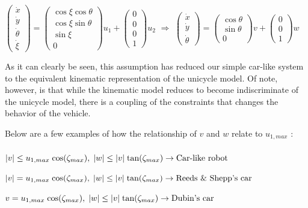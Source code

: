 \documentclass[twoside]{article}
\begin{document}
\begin{center}
$
\begin{pmatrix}
\dot{x} \\ \dot{y} \\ \dot{\theta} \\ \dot{\xi}
\end{pmatrix} =
\begin{pmatrix} \cos \xi \cos \theta \\ \cos \xi \sin \theta \\ \sin \xi \\ 0 \end{pmatrix} u_1 + \begin{pmatrix} 0 \\ 0 \\ 0 \\ 1 \end{pmatrix} u_2
$ $\Rightarrow$ $
\begin{pmatrix}
\dot{x} \\ \dot{y} \\ \dot{\theta}
\end{pmatrix} =
\begin{pmatrix} \cos \theta \\ \sin \theta \\ 0 \end{pmatrix} v + \begin{pmatrix} 0 \\ 0 \\ 1 \end{pmatrix} w
$
\end{center}

As it can clearly be seen, this assumption has reduced our simple car-like system to the equivalent kinematic representation of the unicycle model. Of note, however, is that while the kinematic model reduces to become indiscriminate of the unicycle model, there is a coupling of the constraints that changes the behavior of the vehicle.

Below are a few examples of how the relationship of $v$ and $w$ relate to $u_{1,max}$ \cite{jp}:
\\\\
$
|v| \leq u_{1,max}\;\textup{cos}(\zeta_{max}),\;|w|\leq |v|\;\textup{tan}(\zeta_{max}) \rightarrow \textup{Car-like robot}
$

$
|v|= u_{1,max}\;\textup{cos}(\zeta_{max}),\;|w|\leq |v|\;\textup{tan}(\zeta_{max}) \rightarrow \textup{Reeds \& Shepp's car}
$

$
v= u_{1,max}\;\textup{cos}(\zeta_{max}),\;|w|\leq |v|\;\textup{tan}(\zeta_{max}) \rightarrow \textup{Dubin's car}
$
\end{document}
